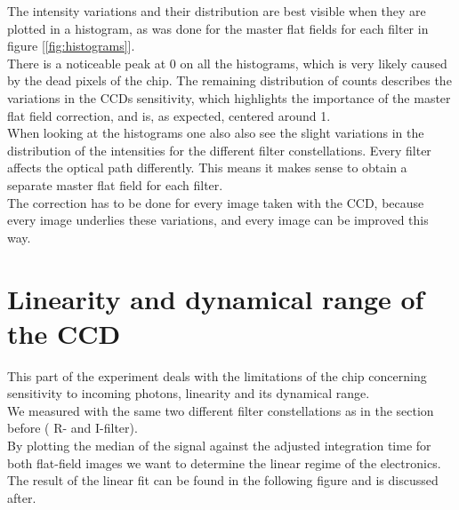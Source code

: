 The intensity variations and their distribution are best visible when they are plotted in a histogram, as was done for the master flat fields for each filter in figure
[\ref{fig:histograms}]. \\
There is a noticeable peak at 0 on all the histograms, which is very likely caused by the dead pixels of the chip.
The remaining distribution of counts describes the variations in the CCDs sensitivity, which highlights the importance of the master flat field correction, and is, as expected, centered around 1.\\
When looking at the histograms one also also see the slight variations in the distribution of the intensities for the different filter constellations. 
Every filter affects the optical path differently.
This means it makes sense to obtain a separate master flat field for each filter.\\
The correction has to be done for every image taken with the CCD, because every image underlies these variations, and every image can be improved this way.

\section{Linearity and dynamical range of the CCD}

This part of the experiment deals with the limitations of the chip concerning sensitivity to incoming photons, linearity and its dynamical range. \\
We measured with the same two different filter constellations  as in the section before ( R- and I-filter). \\
By plotting the median of the signal against the adjusted integration time for both flat-field images we want to determine the linear regime of the electronics. \\
The result of the linear fit can be found in the following figure and is discussed after.

